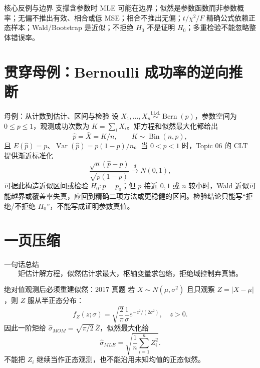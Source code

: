 \documentclass[11pt,a4paper]{ctexart}
\begin{document}
\begin{warnbox}{核心反例与边界}
支撑含参数时 MLE 可能在边界；似然是参数函数而非参数概率；无偏不推出有效、相合或低 MSE；相合不推出无偏；$t/\chi^2/F$ 精确公式依赖正态样本；Wald/Bootstrap 是近似；不拒绝 $H_0$ 不是证明 $H_0$；多重检验不能忽略整体错误率。
\end{warnbox}

\section{贯穿母例：Bernoulli 成功率的逆向推断}

\begin{examplebox}{母例：从计数到估计、区间与检验}
设 $X_1,\ldots,X_n\overset{\mathrm{i.i.d.}}\sim\operatorname{Bern}(p)$，参数空间为 $0\le p\le1$，观测成功次数为 $K=\sum_iX_i$。矩方程和似然最大化都给出
\[
\widehat p=\bar X=K/n,\qquad K\sim\operatorname{Bin}(n,p),
\]
且 $E(\widehat p)=p$、$\operatorname{Var}(\widehat p)=p(1-p)/n$。当 $0<p<1$ 时，Topic 06 的 CLT 提供渐近标准化
\[
\frac{\sqrt n(\widehat p-p)}{\sqrt{p(1-p)}}\xrightarrow{d}N(0,1),
\]
可据此构造近似区间或检验 $H_0:p=p_0$；但 $p$ 接近 $0,1$ 或 $n$ 较小时，Wald 近似可能越界或覆盖率失真，应回到精确二项方法或更稳健的区间。检验结论只能写“拒绝/不拒绝 $H_0$”，不能写成证明参数真值。
\end{examplebox}

\section{一页压缩}

\begin{corebox}{一句话总结}
\[
\boxed{\text{矩估计解方程，似然估计求最大，枢轴变量求包络，拒绝域控制弃真错。}}
\]
\end{corebox}

\begin{examplebox}{绝对值观测后必须重建似然：2017 真题}
若 $X\sim N(\mu,\sigma^2)$ 且只观察 $Z=|X-\mu|$，则 $Z$ 服从半正态分布：
\[
f_Z(z;\sigma)=\sqrt{\frac2\pi}\frac1\sigma e^{-z^2/(2\sigma^2)},\quad z>0.
\]
因此一阶矩给 $\widehat\sigma_{MOM}=\sqrt{\pi/2}\,\bar Z$，似然最大化给
\[
\widehat\sigma_{MLE}=\sqrt{\frac1n\sum_{i=1}^nZ_i^2}.
\]
不能把 $Z_i$ 继续当作正态观测，也不能沿用未知均值的正态似然。
\end{examplebox}
\end{document}
